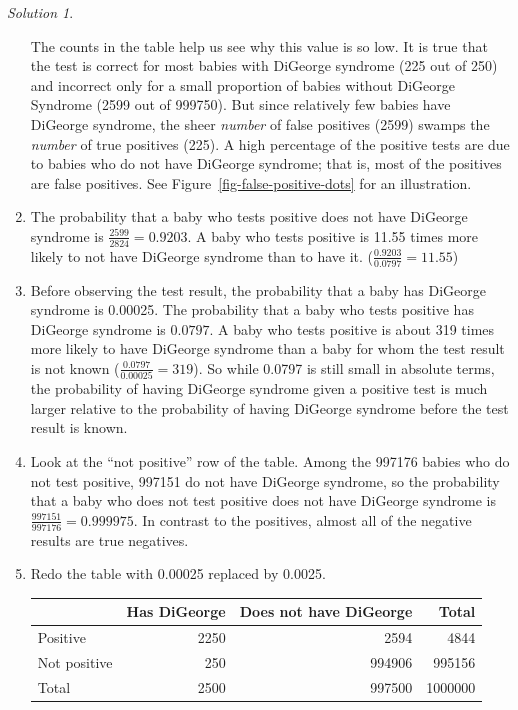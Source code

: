 \documentclass[
  letterpaper,
  DIV=11,
  numbers=noendperiod]{scrreprt}
\theoremstyle{plain}
\theoremstyle{definition}
\theoremstyle{definition}
\theoremstyle{definition}
\theoremstyle{remark}
\newtheorem{refsolution}{Solution}[chapter]
\begin{document}
\begin{tcolorbox}
\begin{refsolution}
\begin{enumerate}
  The counts in the table help us see why this value is so low. It is
  true that the test is correct for most babies with DiGeorge syndrome
  (225 out of 250) and incorrect only for a small proportion of babies
  without DiGeorge Syndrome (2599 out of 999750). But since relatively
  few babies have DiGeorge syndrome, the sheer \emph{number} of false
  positives (2599) swamps the \emph{number} of true positives (225). A
  high percentage of the positive tests are due to babies who do not
  have DiGeorge syndrome; that is, most of the positives are false
  positives. See Figure~\ref{fig-false-positive-dots} for an
  illustration.
\item
  The probability that a baby who tests positive does not have DiGeorge
  syndrome is \(\frac{2599}{2824} = 0.9203\). A baby who tests positive
  is 11.55 times more likely to not have DiGeorge syndrome than to have
  it. (\(\frac{0.9203}{0.0797} = 11.55\))
\item
  Before observing the test result, the probability that a baby has
  DiGeorge syndrome is 0.00025. The probability that a baby who tests
  positive has DiGeorge syndrome is \(0.0797\). A baby who tests
  positive is about 319 times more likely to have DiGeorge syndrome than
  a baby for whom the test result is not known
  (\(\frac{0.0797}{0.00025} = 319\)). So while 0.0797 is still small in
  absolute terms, the probability of having DiGeorge syndrome given a
  positive test is much larger relative to the probability of having
  DiGeorge syndrome before the test result is known.
\item
  Look at the ``not positive'' row of the table. Among the 997176 babies
  who do not test positive, 997151 do not have DiGeorge syndrome, so the
  probability that a baby who does not test positive does not have
  DiGeorge syndrome is \(\frac{997151}{997176} = 0.999975\). In contrast
  to the positives, almost all of the negative results are true
  negatives.
\item
  Redo the table with 0.00025 replaced by 0.0025.

  \begin{longtable}[]{@{}lrrr@{}}
  \toprule\noalign{}
  & Has DiGeorge & Does not have DiGeorge & Total \\
  \midrule\noalign{}
  \endhead
  \bottomrule\noalign{}
  \endlastfoot
  Positive & 2250 & 2594 & 4844 \\
  Not positive & 250 & 994906 & 995156 \\
  Total & 2500 & 997500 & 1000000 \\
  \end{longtable}


\end{enumerate}
\end{refsolution}
\end{tcolorbox}
\end{document}
